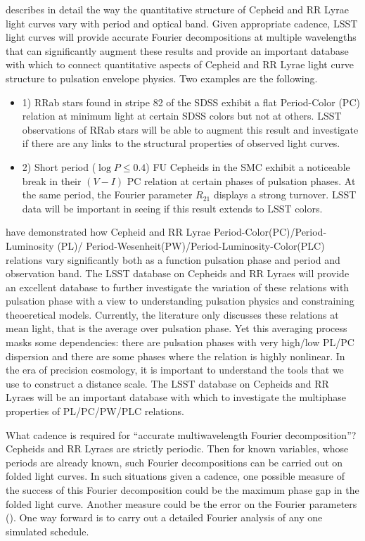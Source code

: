 \citet{2014MNRAS.445.2655B} describes in detail the way the quantitative structure of
Cepheid and RR Lyrae light curves vary with period and optical band. Given
appropriate cadence, LSST light curves will provide accurate Fourier
decompositions at multiple wavelengths that can significantly augment these
results and provide an important database with which to connect quantitative
aspects of Cepheid and RR Lyrae light curve structure to pulsation envelope
physics. Two examples are the following.
\begin{itemize}
\item{1)} RRab stars found in stripe 82 of the
SDSS exhibit a flat Period-Color (PC) relation at minimum light at certain SDSS colors but not at others. LSST observations of RRab stars will be able
to augment this result and investigate if there are any links to the structural properties of observed light curves.
\item{2)} Short period ($\log P \le 0.4$) FU Cepheids in the SMC exhibit a noticeable break in their $(V-I)$ PC relation at certain phases of pulsation
phases. At the same period, the Fourier parameter $R_{21}$ displays a strong turnover. LSST data will be important in seeing if this result extends
to LSST colors.
\end{itemize}

\citet[and references therein]{2014MNRAS.445.2655B,2015MNRAS.447.3342B} have
demonstrated how Cepheid and RR Lyrae
Period-Color(PC)/Period-Luminosity (PL)/
Period-Wesenheit(PW)/Period-Luminosity-Color(PLC) relations vary significantly
both as a function pulsation phase and period and observation band.  The LSST
database on Cepheids and RR Lyraes will provide an excellent database to further
investigate the variation of these relations with pulsation phase with a view
to understanding pulsation physics and constraining theoeretical models.
Currently, the literature only discusses these relations at mean light, that
is the average over pulsation phase. Yet this averaging process masks
some dependencies: there are pulsation phases with very high/low PL/PC
dispersion and there are some phases where the relation is highly nonlinear.
In the era of precision cosmology, it is important to understand the tools that
we use to construct a distance scale. The LSST database on Cepheids and RR
Lyraes will be an important database with which to investigate the multiphase
properties of PL/PC/PW/PLC relations.

What cadence is required for ``accurate multiwavelength Fourier
decomposition''? Cepheids and RR Lyraes are strictly periodic. Then for known variables, whose periods are already known, such
Fourier decompositions can be carried out on folded light curves. In such situations given a cadence, one possible measure of the success of this Fourier decomposition could be the maximum phase gap in the folded light curve. Another measure could be the error on the Fourier parameters (\citep{1986AA...170...59P}). One way forward is to carry out a detailed Fourier analysis of any one simulated schedule.

